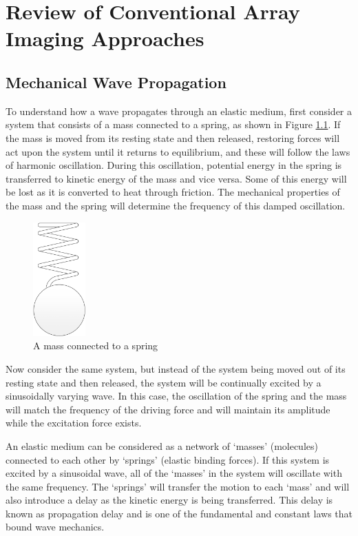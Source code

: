 
\chapter{Review of Conventional Array Imaging Approaches}

\graphicspath{{Review/Images/}}

\section{Mechanical Wave Propagation}
To understand how a wave propagates through an elastic medium, first consider a system that consists of a mass connected to a spring, as shown in Figure \ref{fig:review_massspring}. If the mass is moved from its resting state and then released, restoring forces will act upon the system until it returns to equilibrium, and these will follow the laws of harmonic oscillation. During this oscillation, potential energy in the spring is transferred to kinetic energy of the mass and vice versa. Some of this energy will be lost as it is converted to heat through friction. The mechanical properties of the mass and the spring will determine the frequency of this damped oscillation\cite{rose_basic_1979}.

\begin{figure}[ht]
\centering
		\includegraphics[width=20mm]{MassSpring3.png}
		\caption{A mass connected to a spring}
		\label{fig:review_massspring}
\end{figure}


Now consider the same system, but instead of the system being moved out of its resting state and then released, the system will be continually excited by a sinusoidally varying wave. In this case, the oscillation of the spring and the mass will match the frequency of the driving force and will maintain its amplitude while the excitation force exists.

An elastic medium can be considered as a network of `masses' (molecules) connected to each other by `springs' (elastic binding forces). If this system is excited by a sinusoidal wave, all of the `masses' in the system will oscillate with the same frequency. The `springs' will transfer the motion to each `mass' and will also introduce a delay as the kinetic energy is being transferred. This delay is known as propagation delay and is one of the fundamental and constant laws that bound wave mechanics\cite{achenbach_wave_2012}.

